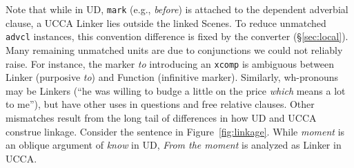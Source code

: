 \documentclass[11pt,a4paper]{article}
\begin{document}
Note that while in UD, \texttt{mark} (e.g., \textit{before})
is attached to the dependent adverbial clause,
a UCCA Linker lies outside the linked Scenes.
To reduce unmatched \texttt{advcl} instances,
this convention difference is fixed by the converter
(\S\ref{sec:local}).
Many remaining unmatched units are due to conjunctions we could not reliably raise.
For instance, the marker \textit{to} introducing an \texttt{xcomp} is ambiguous between Linker
(purposive \textit{to}) and Function (infinitive marker).
Similarly, wh-pronouns may be Linkers
(``he was willing to budge a little on the price {\it which} means a lot to me''),
but have other uses in questions and free relative clauses.
Other mismatches result from the long tail of differences in how UD and UCCA construe linkage.
Consider the sentence in Figure~\ref{fig:linkage}.
While \textit{moment} is an oblique argument of \textit{know} in UD,
\textit{From the moment} is analyzed as Linker in UCCA.
\end{document}
